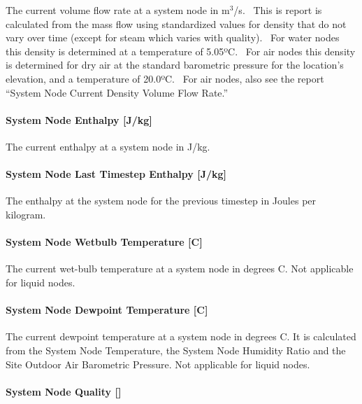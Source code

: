 The current volume flow rate at a system node in m\(^{3}\)/s.~ This is report is calculated from the mass flow using standardized values for density that do not vary over time (except for steam which varies with quality).~ For water nodes this density is determined at a temperature of 5.05ºC.~ For air nodes this density is determined for dry air at the standard barometric pressure for the location's elevation, and a temperature of 20.0ºC.~ For air nodes, also see the report ``System Node Current Density Volume Flow Rate.''

\paragraph{System Node Enthalpy {[}J/kg{]}}\label{system-node-enthalpy-jkg}

The current enthalpy at a system node in J/kg.

\paragraph{System Node Last Timestep Enthalpy {[}J/kg{]}}\label{system-node-last-timestep-enthalpy-jkg}

The enthalpy at the system node for the previous timestep in Joules per kilogram.

\paragraph{System Node Wetbulb Temperature {[}C{]}}\label{system-node-wetbulb-temperature-c}

The current wet-bulb temperature at a system node in degrees C. Not applicable for liquid nodes.

\paragraph{System Node Dewpoint Temperature {[}C{]}}\label{system-node-dewpoint-temperature-c}

The current dewpoint temperature at a system node in degrees C. It is calculated from the System Node Temperature, the System Node Humidity Ratio and the Site Outdoor Air Barometric Pressure. Not applicable for liquid nodes.

\paragraph{\texorpdfstring{System Node Quality {[]}}{System Node Quality }}\label{system-node-quality}

